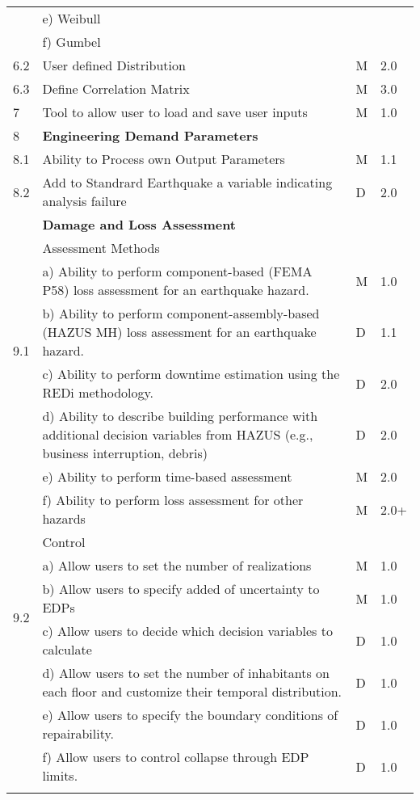 \begin{longtable}{| p{} | p{} | p{} | p{} |}
	 & e)     Weibull &  &  \\ 
	 & f)     Gumbel &  &  \\ \hline
	6.2 & User defined Distribution & M & 2.0 \\ \hline
	6.3 & Define Correlation Matrix & M & 3.0 \\ \hline
	7 & Tool to allow user to load and save user inputs & M & 1.0 \\ \hline
	8 & \textbf{Engineering Demand Parameters} &  &  \\ \hline
	8.1 & Ability to Process own Output Parameters & M & 1.1  \\ \hline
	8.2 & Add to Standrard Earthquake a variable indicating analysis failure & D & 2.0  \\ \hline
\softwareSwitch{PBE}{9 & \textbf{Damage and Loss Assessment} & & \\ \hline
    \multirow{5}{*}{9.1} & Assessment Methods & & \\
     & a) Ability to perform component-based (FEMA P58) loss assessment for an earthquake hazard. & M & 1.0 \\
     & b) Ability to perform component-assembly-based (HAZUS MH) loss assessment for an earthquake hazard. & D & 1.1 \\
     & c) Ability to perform downtime estimation using the REDi methodology. & D & 2.0 \\
     & d) Ability to describe building performance with additional decision variables from HAZUS (e.g., business interruption, debris) & D & 2.0 \\
     & e) Ability to perform time-based assessment & M & 2.0 \\
     & f) Ability to perform loss assessment for other hazards & M & 2.0+ \\ \hline
    \multirow{5}{*}{9.2} & Control & & \\
     & a) Allow users to set the number of realizations & M & 1.0\\
     & b) Allow users to specify added of uncertainty to EDPs & M & 1.0 \\
     & c) Allow users to decide which decision variables to calculate & D & 1.0 \\
     & d) Allow users to set the number of inhabitants on each floor and customize their temporal distribution. & D & 1.0 \\
     & e) Allow users to specify the boundary conditions of repairability. & D & 1.0 \\
     & f) Allow users to control collapse through EDP limits. & D & 1.0\\
}
\end{longtable}

